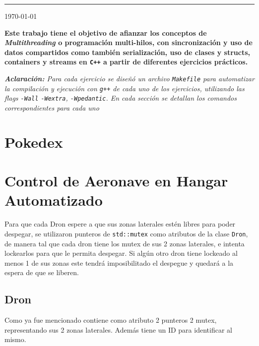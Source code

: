 \documentclass[11pt, a4paper]{article}
\begin{document}
{\noindent\rule{\textwidth}{0.5pt}}


\begin{center}
    {\large \today}
\end{center}

\begin{multicols}{2}

{\bfseries\selectfont Este trabajo tiene el objetivo de afianzar los conceptos de
\textit{Multithreading} o programación multi-hilos, con sincronización y uso de datos
compartidos como también serialización, uso de clases y structs, containers y streams
en \lstinline|C++| a partir de diferentes ejercicios prácticos.
}
\begin{center}
    \small\itshape\textbf{Aclaración:} Para cada ejercicio se diseñó un archivo \lstinline|Makefile|
    para automatizar la compilación y ejecución con \lstinline|g++| de cada uno de los ejercicios, 
    utilizando las flags \lstinline|-Wall| \lstinline|-Wextra|, \lstinline|-Wpedantic|. En cada sección se detallan
    los comandos correspondientes para cada uno 
\end{center}

\section{Pokedex}


\section{Control de Aeronave en Hangar Automatizado}

Para que cada Dron espere a que sus zonas laterales estén libres para poder despegar, se 
utilizaron punteros de \lstinline|std::mutex| como atributos de la clase \lstinline|Dron|,
de manera tal que cada dron tiene los mutex de sus 2 zonas laterales, e intenta lockearlos
para que le permita despegar. Si algún otro dron tiene lockeado al menos 1 de sus zonas este 
tendrá imposibilitado el despegue y quedará a la espera de que se liberen.

\subsection{Dron}

Como ya fue mencionado contiene como atributo 2 punteros 2 mutex, representando sus 2 zonas
laterales. Además tiene un ID para identificar al mismo.


\end{multicols}
\end{document}
